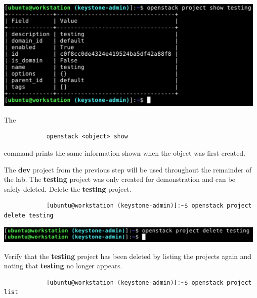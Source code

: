 \documentclass[letterpaper, 12pt]{article}
\begin{document}
\begin{enumerate}
\begin{labstep}
        \begin{center}
            \includegraphics[width=\linewidth]{images/part2/step8.png}
        \end{center}
    \end{labstep}

    \begin{tipbox}
        The
        \begin{lstlisting}
            openstack <object> show
        \end{lstlisting}
        command prints the same information shown when the object was first created.
    \end{tipbox}

    \begin{labstep}
        The \textbf{dev} project from the previous step will be used throughout the remainder of the lab.
        The \textbf{testing} project was only created for demonstration and can be safely deleted.
        Delete the \textbf{testing} project.
        \begin{lstlisting}
            [ubuntu@workstation (keystone-admin)]:~$ openstack project delete testing
        \end{lstlisting}

        \begin{center}
            \includegraphics[width=\linewidth]{images/part2/step9.png}
        \end{center}
    \end{labstep}

    \begin{labstep}
        Verify that the \textbf{testing} project has been deleted by listing the projects again and noting that
        \textbf{testing} no longer appears.
        \begin{lstlisting}
            [ubuntu@workstation (keystone-admin)]:~$ openstack project list
        \end{lstlisting}


\end{labstep}
\end{enumerate}
\end{document}
